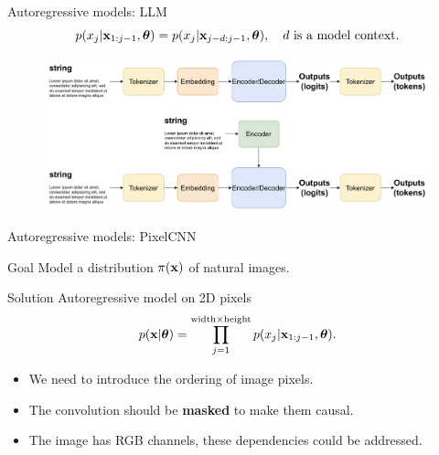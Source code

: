 \begin{frame}{Autoregressive models: LLM}
	\[
		p(x_j | \mathbf{x}_{1:j - 1}, \boldsymbol{\theta}) = p(x_j | \mathbf{x}_{j - d:j - 1}, \boldsymbol{\theta}), \quad d \text{ is a model context}.
	\]
	 \begin{figure}
		   \centering
		   \includegraphics[width=1.0\linewidth]{figs/llm_modeling}
	 \end{figure}
\end{frame}
\begin{frame}{Autoregressive models: PixelCNN}
	\begin{block}{Goal}
		Model a distribution $\pi(\mathbf{x})$ of natural images.
	\end{block}
	\begin{block}{Solution}
		Autoregressive model on 2D pixels
		\[
		    p(\mathbf{x} | \boldsymbol{\theta}) = \prod_{j=1}^{\text{width} \times \text{height}} p(x_j|\mathbf{x}_{1:j-1}, \boldsymbol{\theta}).
		\]
		\begin{itemize}
			\item We need to introduce the ordering of image pixels.
		    \item The convolution should be \textbf{masked} to make them causal.
		    \item The image has RGB channels, these dependencies could be addressed.
		\end{itemize}
	\end{block}
\end{frame}
